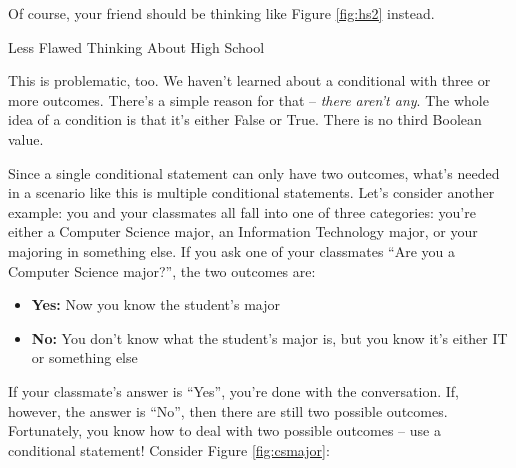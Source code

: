 Of course, your friend should be thinking like Figure \ref{fig:hs2} instead.

\begin{center}
    \begin{myfigure}[label=fig:hs2]{Less Flawed Thinking About High School}
    \end{myfigure}
\end{center}

This is problematic, too.  We haven't learned about a conditional with three or more outcomes.  There's a simple reason for that -- \textit{there aren't any}.  The whole idea of a condition is that it's either False or True.  There is no third Boolean value.

Since a single conditional statement can only have two outcomes, what's needed in a scenario like this is multiple conditional statements.  Let's consider another example: you and your classmates all fall into one of three categories: you're either a Computer Science major, an Information Technology major, or your majoring in something else.  If you ask one of your classmates ``Are you a Computer Science major?'', the two outcomes are:

\begin{itemize}
    \item \textbf{Yes:} Now you know the student's major
    \item \textbf{No:} You don't know what the student's major is, but you know it's either IT or something else
\end{itemize}

If your classmate's answer is ``Yes'', you're done with the conversation.  If, however, the answer is ``No'', then there are still two possible outcomes.  Fortunately, you know how to deal with two possible outcomes -- use a conditional statement!  Consider Figure \ref{fig:csmajor}:

